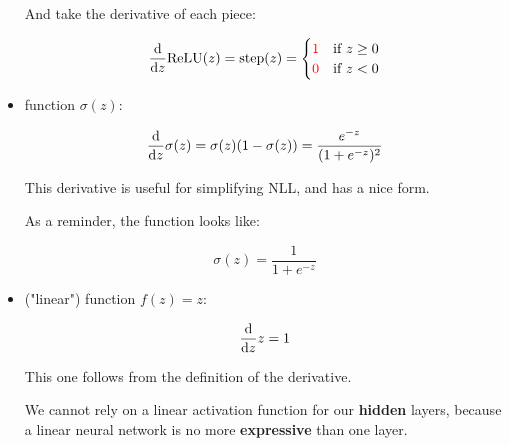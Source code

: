 \begin{itemize}
                And take the derivative of each piece:
                
                \begin{equation}
                    \frac{\dd }{\dd z} \text{ReLU}(z)
                    =
                    \text{step}(z) 
                    =
                    \begin{cases}
                      \textcolor{red}{1} & \text{if $z \geq 0$}\\
                      \textcolor{red}{0} & \text{if $z < 0$}
                    \end{cases}
                \end{equation}
               
                
            \item {} function $\sigma(z)$:
            
                \begin{equation}
                    \frac{\dd }{\dd z}\sigma(z) 
                    =
                    \sigma(z)(1-\sigma(z))
                    =
                    \frac{e^{-z}}{(1+e^{-z})^2}
                \end{equation}
                
                This derivative is useful for simplifying NLL, and has a nice form.
                    
                As a reminder, the function looks like:
                
                \begin{equation}
                    \sigma(z) 
                    =
                    \frac{1}{1+e^{-z}}
                \end{equation}
                
            \item {} ("linear") function $f(z)=z$:
            
                \begin{equation}
                    \frac{\dd }{\dd z} z
                    =
                    1
                \end{equation}
                
                This one follows from the definition of the derivative.
                
                We cannot rely on a linear activation function for our \textbf{hidden} layers, because a linear neural network is no more \textbf{expressive} than one layer.
                

\end{itemize}
